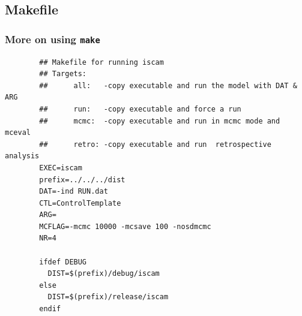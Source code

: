 \subsection{Makefile} %
\label{sub:makefile}
\lstset{language=Pascal}
\begin{frame}[fragile,shrink=40]
	\frametitle{More on using \texttt{make}}
	\begin{code}
		
	
	\begin{lstlisting}
		## Makefile for running iscam
		## Targets: 
		##		all:   -copy executable and run the model with DAT & ARG
		##		run:   -copy executable and force a run
		##		mcmc:  -copy executable and run in mcmc mode and mceval
		##		retro: -copy executable and run  retrospective analysis
		EXEC=iscam
		prefix=../../../dist
		DAT=-ind RUN.dat
		CTL=ControlTemplate
		ARG=
		MCFLAG=-mcmc 10000 -mcsave 100 -nosdmcmc
		NR=4

		ifdef DEBUG
		  DIST=$(prefix)/debug/iscam
		else
		  DIST=$(prefix)/release/iscam
		endif
		
	\end{lstlisting}
	\end{code}
\end{frame}
